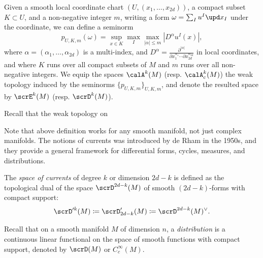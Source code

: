 \begin{definition}
	Given a smooth local coordinate chart \((U, (x_1, \ldots, x_{2d}))\), a compact subset \(K \subset U\), and a non-negative integer \(m\), writing a form $\omega = \sum_I u^I \upd x_I$ under the coordinate, we can define a seminorm
	\[ p_{U,K,m}(\omega) = \sup_{x \in K} \max_{I} \max_{|\alpha| \leq m} |D^{\alpha} u^I(x)|, \]
	where \(\alpha = (\alpha_1, \ldots, \alpha_{2d})\) is a multi-index, and \(D^{\alpha} = \frac{\partial^{|\alpha|}}{\partial x_1^{\alpha_1} \cdots \partial x_{2d}^{\alpha_{2d}}}\) in local coordinates, and
	where \(K\) runs over all compact subsets of \(M\) and \(m\) runs over all non-negative integers.
	We equip the spaces $\calA^k(M)$ (resp. $\calA^k_c(M)$) the weak topology induced by the seminorms $\{p_{U,K,m}\}_{U,K,m}$, and denote the resulted space by $\scrE^k(M)$ (resp. $\scrD^k(M)$).
\end{definition}

\begin{remark}
	Recall that the weak topology on \Yang{}
\end{remark}

Note that above definition works for any smooth manifold, not just complex manifolds.
The notions of currents was introduced by de Rham in the 1950s, and they provide a general framework for differential forms, cycles, measures, and distributions.

\begin{definition}
	The \emph{space of currents} of degree \(k\) or dimension $2d - k$ is defined as the topological dual of the space $\scrD^{2d-k}(M)$ of smooth \((2d-k)\)-forms with compact support:
	\[ \scrD'^k(M) \coloneqq \scrD'_{2d-k}(M) \coloneqq \scrD^{2d-k}(M)^\vee. \]
\end{definition}

\begin{remark}
	Recall that on a smooth manifold \(M\) of dimension \(n\), a \emph{distribution} is a continuous linear functional on the space of smooth functions with compact support, denoted by \(\scrD(M)\) or \(C_c^\infty(M)\).
	\Yang{}
\end{remark}


